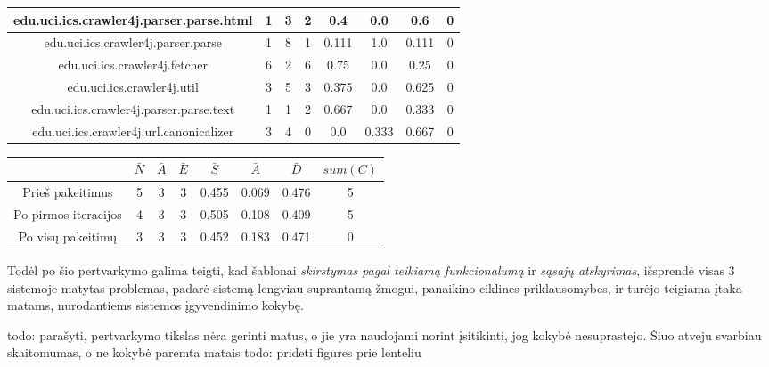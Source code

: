 \begin{center}
\begin{tabular}{|c|c|c|c|c|c|c|c|}
        edu.uci.ics.crawler4j.parser.parse.html & 1 & 3 & 2 & 0.4 & 0.0 & 0.6 & 0\\
        \hline
        edu.uci.ics.crawler4j.parser.parse & 1 & 8 & 1 & 0.111 & 1.0 & 0.111 & 0 \\
        \hline
        edu.uci.ics.crawler4j.fetcher & 6 & 2 & 6 & 0.75 & 0.0 & 0.25 & 0 \\
        \hline
        edu.uci.ics.crawler4j.util & 3 & 5 & 3 & 0.375 & 0.0 & 0.625 & 0 \\
        \hline
        edu.uci.ics.crawler4j.parser.parse.text & 1 & 1 & 2 & 0.667 & 0.0 & 0.333 & 0 \\
        \hline
        edu.uci.ics.crawler4j.url.canonicalizer & 3 & 4 & 0 & 0.0 & 0.333 & 0.667 & 0 \\
        \hline
    \end{tabular}
    \begin{tabular}{|c|c|c|c|c|c|c|c|}
        \hline
        & $\bar{N}$ & $\bar{A}$ & $\bar{E}$ & $\bar{S}$ & $\bar{A}$ & $\bar{D}$ & $sum(C)$\\ [0.5ex]
        \hline\hline
        Prieš pakeitimus & 5 & 3 & 3 & 0.455 & 0.069 & 0.476 & 5\\
        \hline
        Po pirmos iteracijos & 4 & 3 & 3 & 0.505 & 0.108 & 0.409 & 5 \\
        \hline
        Po visų pakeitimų & 3 & 3 & 3 & 0.452 & 0.183 & 0.471 & 0 \\
        \hline
    \end{tabular}
\end{center}
Todėl po šio pertvarkymo galima teigti, kad šablonai \textit{skirstymas pagal teikiamą funkcionalumą} ir \textit{sąsajų atskyrimas}, išsprendė visas 3 sistemoje matytas problemas,
padarė sistemą lengviau suprantamą žmogui, panaikino ciklines priklausomybes, ir turėjo teigiama įtaka matams, nurodantiems
sistemos įgyvendinimo kokybę.

todo: parašyti, pertvarkymo tikslas nėra gerinti matus, o jie yra naudojami norint įsitikinti, jog kokybė nesuprastejo. Šiuo atveju svarbiau skaitomumas, o ne kokybė paremta matais
todo: prideti figures prie lenteliu